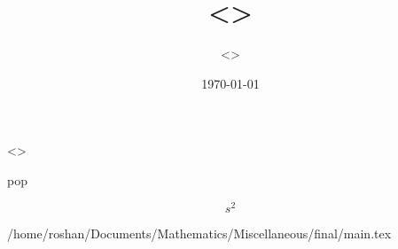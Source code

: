 \documentclass[12pt]{article}
\title{<>}
\author{<>}
\date{\today}
\begin{document}
\maketitle
\tableofcontents
\newpage
\thispagestyle{empty}

<>

pop

\begin{equation*}
    s^2
\end{equation*}

/home/roshan/Documents/Mathematics/Miscellaneous/final/main.tex
\end{document}
